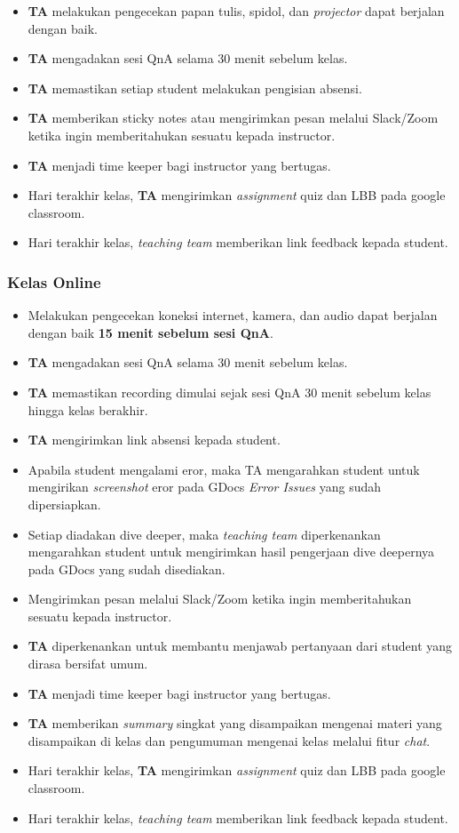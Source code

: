 \documentclass[
]{book}
\providecommand{\tightlist}{%
  \setlength{\itemsep}{0pt}\setlength{\parskip}{0pt}}
\begin{document}
\begin{itemize}
\tightlist
\item
  \textbf{TA} melakukan pengecekan papan tulis, spidol, dan \emph{projector} dapat berjalan dengan baik.
\item
  \textbf{TA} mengadakan sesi QnA selama 30 menit sebelum kelas.
\item
  \textbf{TA} memastikan setiap student melakukan pengisian absensi.
\item
  \textbf{TA} memberikan sticky notes atau mengirimkan pesan melalui Slack/Zoom ketika ingin memberitahukan sesuatu kepada instructor.
\item
  \textbf{TA} menjadi time keeper bagi instructor yang bertugas.
\item
  Hari terakhir kelas, \textbf{TA} mengirimkan \emph{assignment} quiz dan LBB pada google classroom.
\item
  Hari terakhir kelas, \emph{teaching team} memberikan link feedback kepada student.
\end{itemize}

\hypertarget{kelas-online-1}{%
\subsubsection{Kelas Online}\label{kelas-online-1}}

\begin{itemize}
\tightlist
\item
  Melakukan pengecekan koneksi internet, kamera, dan audio dapat berjalan dengan baik \textbf{15 menit sebelum sesi QnA}.
\item
  \textbf{TA} mengadakan sesi QnA selama 30 menit sebelum kelas.
\item
  \textbf{TA} memastikan recording dimulai sejak sesi QnA 30 menit sebelum kelas hingga kelas berakhir.
\item
  \textbf{TA} mengirimkan link absensi kepada student.
\item
  Apabila student mengalami eror, maka TA mengarahkan student untuk mengirikan \emph{screenshot} eror pada GDocs \emph{Error Issues} yang sudah dipersiapkan.
\item
  Setiap diadakan dive deeper, maka \emph{teaching team} diperkenankan mengarahkan student untuk mengirimkan hasil pengerjaan dive deepernya pada GDocs yang sudah disediakan.
\item
  Mengirimkan pesan melalui Slack/Zoom ketika ingin memberitahukan sesuatu kepada instructor.
\item
  \textbf{TA} diperkenankan untuk membantu menjawab pertanyaan dari student yang dirasa bersifat umum.
\item
  \textbf{TA} menjadi time keeper bagi instructor yang bertugas.
\item
  \textbf{TA} memberikan \emph{summary} singkat yang disampaikan mengenai materi yang disampaikan di kelas dan pengumuman mengenai kelas melalui fitur \emph{chat}.
\item
  Hari terakhir kelas, \textbf{TA} mengirimkan \emph{assignment} quiz dan LBB pada google classroom.
\item
  Hari terakhir kelas, \emph{teaching team} memberikan link feedback kepada student.
\end{itemize}
\end{document}
